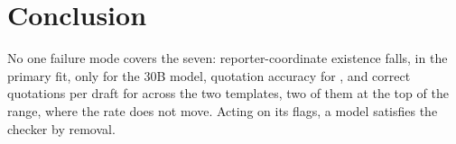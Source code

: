 \documentclass{IOS-Book-Article}
\begin{document}
\section{Conclusion}\label{sec:conclusion}

No one failure mode covers the seven: reporter-coordinate existence falls, in the primary fit, only for the 30B model, quotation accuracy for \primQuoteFallModels{}, and correct quotations per draft for \countEitherModels{} across the two templates, two of them at the top of the range, where the rate does not move. Acting on its flags, a model satisfies the checker by removal.



\end{document}
